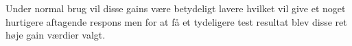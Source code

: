 Under normal brug vil disse gains være betydeligt lavere hvilket vil give et noget hurtigere aftagende respons men for at få et tydeligere test resultat blev disse ret høje gain værdier valgt.
%

